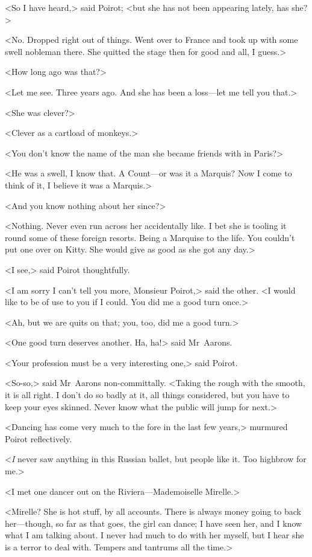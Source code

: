 <So I have heard,> said Poirot; <but she has not been appearing lately, has she?>

<No. Dropped right out of things. Went over to France and took up with some swell nobleman there. She quitted the stage then for good and all, I guess.>

<How long ago was that?>

<Let me see. Three years ago. And she has been a loss—let me tell you that.>

<She was clever?>

<Clever as a cartload of monkeys.>

<You don't know the name of the man she became friends with in Paris?>

<He was a swell, I know that. A Count—or was it a Marquis? Now I come to think of it, I believe it was a Marquis.>

<And you know nothing about her since?>

<Nothing. Never even run across her accidentally like. I bet she is tooling it round some of these foreign resorts. Being a Marquise to the life. You couldn't put one over on Kitty. She would give as good as she got any day.>

<I see,> said Poirot thoughtfully.

<I am sorry I can't tell you more, Monsieur Poirot,> said the other. <I would like to be of use to you if I could. You did me a good turn once.>

<Ah, but we are quits on that; you, too, did me a good turn.>

<One good turn deserves another. Ha, ha!> said Mr~Aarons.

<Your profession must be a very interesting one,> said Poirot.

<So-so,> said Mr~Aarons non-committally. <Taking the rough with the smooth, it is all right. I don't do so badly at it, all things considered, but you have to keep your eyes skinned. Never know what the public will jump for next.>

<Dancing has come very much to the fore in the last few years,> murmured Poirot reflectively.

<\emph{I} never saw anything in this Russian ballet, but people like it. Too highbrow for me.>

<I met one dancer out on the Riviera—Mademoiselle Mirelle.>

<Mirelle? She is hot stuff, by all accounts. There is always money going to back her—though, so far as that goes, the girl can dance; I have seen her, and I know what I am talking about. I never had much to do with her myself, but I hear she is a terror to deal with. Tempers and tantrums all the time.>

